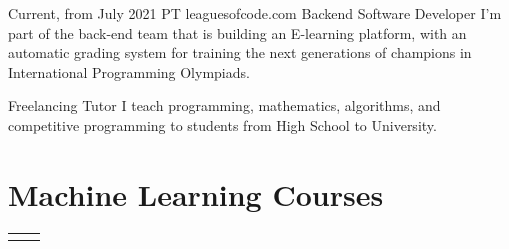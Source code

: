 \documentclass[
	10pt, %
]{FreemanCV}
\begin{document}
\begin{paracol}{2}


\jobentry
	{Current, from July 2021} %
	{PT} %
	{leaguesofcode.com} %
	{Backend Software Developer} %
	{I'm part of the back-end team that is building an E-learning platform, with an automatic grading system for training the next generations of champions in International Programming Olympiads.
    } %


\jobentry
	{} %
	{} %
	{Freelancing} %
	{Tutor} %
	{I teach programming, mathematics, algorithms, and competitive programming to students from High School to University.
    } %


\section{Machine Learning Courses} 




\begin{supertabular}{r l} %
	
	
	
	
\end{supertabular}



\end{paracol}
\end{document}
